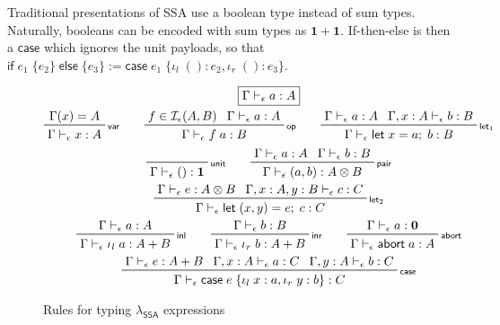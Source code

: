 \documentclass[acmsmall,screen,review]{acmart}
\newcommand{\mc}[1]{\ensuremath{\mathcal{#1}}}
\newcommand{\mb}[1]{\ensuremath{\mathbf{#1}}}
\newcommand{\ms}[1]{\ensuremath{\mathsf{#1}}}
\newcommand{\lto}{:}
\newcommand{\linl}[1]{\iota_l\;{#1}}
\newcommand{\linr}[1]{\iota_r\;{#1}}
\newcommand{\labort}[1]{\ms{abort}\;{#1}}
\newcommand{\letexpr}[3]{\ensuremath{\ms{let}\;#1 = #2;\;#3}}
\newcommand{\caseexpr}[5]{\ms{case}\;#1\;\{\linl{#2} \lto #3, \linr{#4} \lto #5\}}
\newcommand{\ite}[3]{\ms{if}\;#1\;\{#2\}\;\ms{else}\;\{#3\}}
\newcommand{\bhyp}[2]{#1 : #2}
\newcommand{\rle}[1]{{\scriptsize\textsf{#1}}}
\newcommand{\hasty}[4]{#1 \vdash_{#2} #3: {#4}}
\newcommand{\isop}[4]{#1 \in \mc{I}_{#4}(#2, #3)}
\newcommand{\isotopessa}{\(\lambda_{\ms{SSA}}\)}
\begin{document}
Traditional presentations of SSA use a boolean type instead of sum types. Naturally, booleans can be
encoded with sum types as $\mb{1} + \mb{1}$. If-then-else is then a $\ms{case}$ which ignores the
unit payloads, so that $\ite{e_1}{e_2}{e_3} := \caseexpr{e_1}{()}{e_2}{()}{e_3}$. 


\begin{figure}
  \begin{gather*}
    \boxed{\hasty{\Gamma}{\epsilon}{a}{A}} \\
    \prftree[r]{\rle{var}}{\Gamma(x) = A}{\hasty{\Gamma}{\epsilon}{x}{A}} \qquad
    \prftree[r]{\rle{op}}{\isop{f}{A}{B}{\epsilon}}{\hasty{\Gamma}{\epsilon}{a}{A}}
      {\hasty{\Gamma}{\epsilon}{f\;a}{B}} \qquad
    \prftree[r]{\rle{let$_1$}}
      {\hasty{\Gamma}{\epsilon}{a}{A}}
      {\hasty{\Gamma, \bhyp{x}{A}}{\epsilon}{b}{B}}
      {\hasty{\Gamma}{\epsilon}{\letexpr{x}{a}{b}}{B}} \\
    \prftree[r]{\rle{unit}}{\hasty{\Gamma}{\epsilon}{()}{\mb{1}}} \qquad
    \prftree[r]{\rle{pair}}{\hasty{\Gamma}{\epsilon}{a}{A}}{\hasty{\Gamma}{\epsilon}{b}{B}}
      {\hasty{\Gamma}{\epsilon}{(a, b)}{A \otimes B}} \\
    \prftree[r]{\rle{let$_2$}}
      {\hasty{\Gamma}{\epsilon}{e}{A \otimes B}}
      {\hasty{\Gamma, \bhyp{x}{A}, \bhyp{y}{B}}{\epsilon}{c}{C}}
      {\hasty{\Gamma}{\epsilon}{\letexpr{(x, y)}{e}{c}}{C}} \\
    \prftree[r]{\rle{inl}}{\hasty{\Gamma}{\epsilon}{a}{A}}
      {\hasty{\Gamma}{\epsilon}{\linl{a}}{A + B}} \qquad
    \prftree[r]{\rle{inr}}{\hasty{\Gamma}{\epsilon}{b}{B}}
      {\hasty{\Gamma}{\epsilon}{\linr{b}}{A + B}} \qquad
    \prftree[r]{\rle{abort}}{\hasty{\Gamma}{\epsilon}{a}{\mb{0}}}
      {\hasty{\Gamma}{\epsilon}{\labort{a}}{A}} \\
    \prftree[r]{\rle{case}}
      {\hasty{\Gamma}{\epsilon}{e}{A + B}}
      {\hasty{\Gamma, \bhyp{x}{A}}{\epsilon}{a}{C}}
      {\hasty{\Gamma, \bhyp{y}{A}}{\epsilon}{b}{C}}
      {\hasty{\Gamma}{\epsilon}{\caseexpr{e}{x}{a}{y}{b}}{C}}
  \end{gather*}
  \caption{Rules for typing \isotopessa{} expressions}
  \Description{}
  \label{fig:ssa-expr-rules}
\end{figure}
\end{document}
